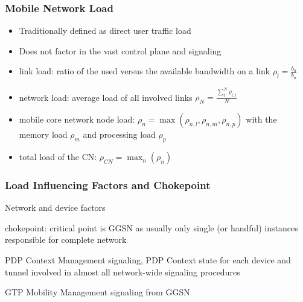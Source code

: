 \documentclass{beamer}
\begin{document}
\begin{frame}
	\frametitle{Mobile Network Load}
	
	\begin{itemize}
		\item Traditionally defined as direct user traffic load

		\item Does not factor in the vast control plane and signaling

		\item link load: ratio of the used versus the available bandwidth on a link $\rho_{l} = \frac{b_{u}}{b_{a}}$

		\item network load: average load of all involved links $\rho_{N} = \frac{\sum_{i}^{N} \rho_{l,i}}{N}$

		\item mobile core network node load: $\rho_{n} = \max(\rho_{n,l}, \rho_{n,m}, \rho_{n,p})$ 	with the memory load $\rho_{m}$ and processing load $\rho_{p}$

		\item total load of the CN: $\rho_{CN} = \max_{n}(\rho_{n})$
	\end{itemize}

\end{frame}

\begin{frame}
	\frametitle{Load Influencing Factors and Chokepoint}
	Network and device factors

	chokepoint: critical point is GGSN as usually only single (or handful) instances responsible for complete network

	PDP Context Management signaling, PDP Context state for each device and tunnel 
		involved in almost all network-wide signaling procedures

	GTP Mobility Management signaling from GGSN
\end{frame}
\end{document}
